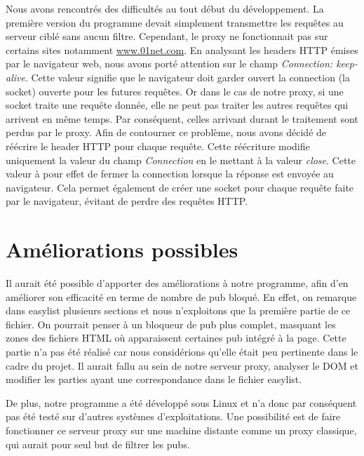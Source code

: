 \documentclass[a4paper,11pt, oneside]{book}
\begin{document}
			\noindent Nous avons rencontrés des difficultés au tout début du développement.
			La première version du programme devait simplement transmettre les requêtes au serveur ciblé sans aucun filtre.
			Cependant, le proxy ne fonctionnait pas sur certains sites notamment \href{http://www.01net.com}{www.01net.com}.
			En analysant les headers HTTP émises par le navigateur web, nous avons porté attention sur le champ
			\textit{Connection: keep-alive}. Cette valeur signifie que le navigateur doit garder ouvert la connection (la socket) ouverte
			pour les futures requêtes. Or dans le cas de notre proxy, si une socket traite une requête donnée, elle ne peut
			pas traiter les autres requêtes qui arrivent en même temps. Par conséquent, celles arrivant durant le traitement sont perdus par
			le proxy. Afin de contourner ce problème,
			nous avons décidé de réécrire le header HTTP pour chaque requête. Cette réécriture
			modifie uniquement la valeur du champ \textit{Connection} en le mettant à la valeur \textit{close}.
			Cette valeur à pour effet de fermer la connection lorsque la réponse est envoyée au navigateur. Cela permet
			également de créer une socket pour chaque requête faite par le navigateur, évitant de perdre des requêtes HTTP.

		\section{Améliorations possibles}

			Il aurait été possible d'apporter des améliorations à notre programme, afin d'en améliorer son efficacité en terme
			de nombre de pub bloqué. En effet, on remarque dans easylist plusieurs sections et nous n'exploitons que la première partie
			de ce fichier. On pourrait penser à un bloqueur de pub plus complet, masquant les zones des fichiers HTML où apparaissent certaines
			pub intégré à la page. Cette partie n'a pas été réalisé car nous considérions qu'elle était peu pertinente dans le cadre du projet.
			Il aurait fallu au sein de notre serveur proxy, analyser le DOM et modifier les parties ayant une correspondance dans le fichier
			easylist.

			De plus, notre programme a été développé sous Linux et n'a donc par conséquent pas été testé sur d'autres systèmes d'exploitations.
			Une possibilité est de faire fonctionner ce serveur proxy sur une machine distante comme un proxy classique, qui aurait pour seul but
			de filtrer les pubs.
\end{document}
